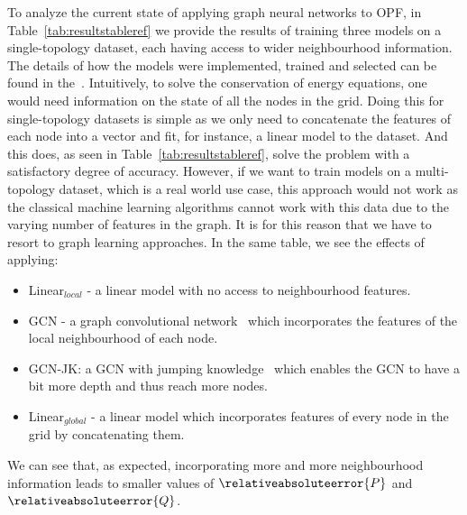 \usepackage{lstmisc}To analyze the current state of applying graph neural networks to
OPF, in Table~\ref{tab:resultstableref} we provide the results of training three models on a single-topology dataset, each having access to
wider neighbourhood information.
The details of how the models were implemented, trained and selected can be found in the~.
Intuitively, to solve the conservation of energy equations, one would need information on the
state of all the nodes in the grid.
Doing this for single-topology datasets is simple as we only need to concatenate the
features of each node into a vector and fit, for instance, a linear model to the dataset.
And this does, as seen in Table~\ref{tab:resultstableref},
solve the problem with a satisfactory degree of accuracy.
However, if we want to train models on a multi-topology dataset, which is a real world use case,
this approach would not work as the classical machine learning algorithms cannot work with
this data due to the varying number of features in the graph.
It is for this reason that we have to resort to graph learning approaches.
In the same table, we see the effects of applying:

\begin{itemize}
    \item Linear$_{local}$ - a linear model with no access to neighbourhood features.
    \item GCN - a graph convolutional network~\cite{kipf2016semi} which incorporates the features of the
    local neighbourhood of each node.
    \item GCN-JK: a GCN with jumping knowledge~\cite{xu2018representation} which enables the GCN to have a bit
    more depth and thus reach more nodes.
    \item Linear$_{global}$ - a linear model which incorporates features of every node in the grid
    by concatenating them.
\end{itemize}

\noindent We can see that, as expected, incorporating more and more neighbourhood information leads to
smaller values of $\relativeabsoluteerror{P}$ and $\relativeabsoluteerror{Q}$.

